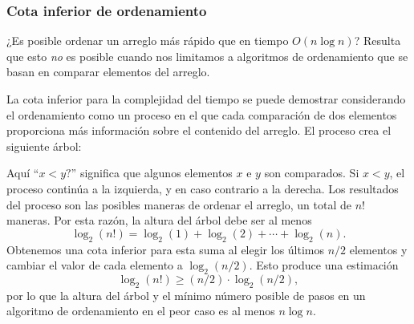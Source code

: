 \subsubsection{Cota inferior de ordenamiento}

¿Es posible ordenar un arreglo más rápido
que en tiempo $O(n \log n)$?
Resulta que esto \emph{no} es posible
cuando nos limitamos a algoritmos de ordenamiento
que se basan en comparar elementos del arreglo.

La cota inferior para la complejidad del tiempo
se puede demostrar considerando el ordenamiento
como un proceso en el que cada comparación de dos elementos
proporciona más información sobre el contenido del arreglo.
El proceso crea el siguiente árbol:

\begin{center}
\end{center}

Aquí ``$x<y?$'' significa que algunos elementos
$x$ e $y$ son comparados.
Si $x<y$, el proceso continúa a la izquierda,
y en caso contrario a la derecha.
Los resultados del proceso son las posibles
maneras de ordenar el arreglo, un total de $n!$ maneras.
Por esta razón, la altura del árbol
debe ser al menos
\[ \log_2(n!) = \log_2(1)+\log_2(2)+\cdots+\log_2(n).\]
Obtenemos una cota inferior para esta suma
al elegir los últimos $n/2$ elementos y
cambiar el valor de cada elemento a $\log_2(n/2)$.
Esto produce una estimación
\[ \log_2(n!) \ge (n/2) \cdot \log_2(n/2),\]
por lo que la altura del árbol y el mínimo
número posible de pasos en un algoritmo de ordenamiento
en el peor caso
es al menos $n \log n$.

